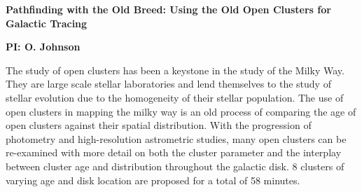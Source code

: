 \documentclass[11pt]{article}
\begin{document}
%
%
%
\centerline{\large{\bf
{Pathfinding with the Old Breed: Using the Old Open Clusters for Galactic Tracing}}}  

\medskip
% 
\centerline{\bf PI: 
{O. Johnson}}
 
\bigskip
%
\smallskip

The study of open clusters has been a keystone in the study of the Milky Way. They are large scale stellar laboratories and lend themselves to the study of stellar evolution due to the homogeneity of their stellar population. The use of open clusters in mapping the milky way is an old process of comparing the age of open clusters against their spatial distribution. With the progression of photometry and high-resolution astrometric studies, many open clusters can be re-examined with more detail on both the cluster parameter and the interplay between cluster age and distribution throughout the galactic disk. 8 clusters of varying age and disk location are proposed for a total of 58 minutes.

%
%
%
%




%
%
%
\begin{multicols}{2}
{}

\end{multicols}
\vfill



%


\end{document}
